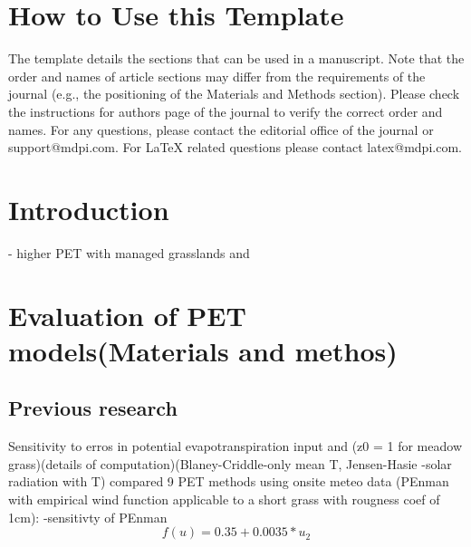 \documentclass[hydrology,article,submit,moreauthors,pdftex]{Definitions/mdpi}
\begin{document}

\setcounter{section}{-1} %
\section{How to Use this Template}
The template details the sections that can be used in a manuscript. Note that the order and names of article sections may differ from the requirements of the journal (e.g., the positioning of the Materials and Methods section). Please check the instructions for authors page of the journal to verify the correct order and names. For any questions, please contact the editorial office of the journal or support@mdpi.com. For LaTeX related questions please contact latex@mdpi.com.

\section{Introduction}
\cite{obojes2015vegetation} - higher PET with managed grasslands and \cite{leitinger2015impact}


\section{Evaluation of PET models(Materials and methos)}

\subsection{Previous research}
Sensitivity to erros in potential evapotranspiration input \cite{parmele1972errors}
\cite{parmele1974comparisons} and \cite{mcguinness1972comparison}(z0 = 1 for meadow grass)(details of computation)(Blaney-Criddle-only mean T, Jensen-Hasie \cite{jensen1963estimating}-solar radiation with T) compared 9 PET methods using onsite meteo data
(PEnman with empirical wind function applicable to a short grass with rougness coef of 1cm): 
\cite{andreassian2004impact}-sensitivty of PEnman
\begin{equation}
f(u)=0.35+0.0035*u_2
\end{equation}
\end{document}
